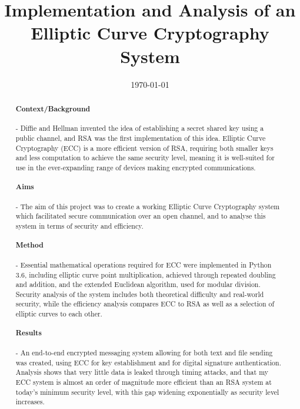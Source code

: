 \documentclass[12pt,a4paper]{article}
\title{Implementation and Analysis of an Elliptic Curve Cryptography System}
\date{\today}
\begin{document}
\maketitle

\begin{abstract}

    \vspace{-5mm}
    \paragraph{Context/Background} -
    Diffie and Hellman invented the idea of establishing a secret shared key using a public channel, and 
    RSA was the first implementation of this idea. 
    Elliptic Curve Cryptography (ECC) is a more efficient version of RSA, requiring both smaller keys and less computation to achieve the same security level, meaning it is well-suited for use in the ever-expanding range of devices making encrypted communications. 
    
    \vspace{-5mm}
    \paragraph{Aims} -
    The aim of this project was to create a working Elliptic Curve Cryptography system which facilitated secure communication over an open channel, 
    and to analyse this system in terms of security and efficiency. 

    \vspace{-5mm}
    \paragraph{Method} -
    Essential mathematical operations required for ECC were implemented in Python 3.6, including elliptic curve point multiplication, achieved through repeated doubling and addition, and the extended Euclidean algorithm, used for modular division. 
    Security analysis of the system includes both theoretical difficulty and real-world security, 
    while the efficiency analysis compares ECC to RSA as well as a selection of elliptic curves to each other. 

    \vspace{-5mm}
    \paragraph{Results} -
    An end-to-end encrypted messaging system allowing for both text and file sending was created, using ECC for key establishment and for digital signature authentication. 
    Analysis shows that very little data is leaked through timing attacks, and that my ECC system is almost an order of magnitude more efficient than an RSA system at today's minimum security level, with this gap widening exponentially as security level increases. 


\end{abstract}
\end{document}
